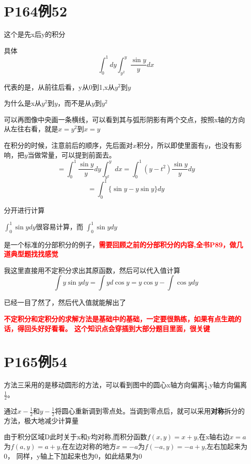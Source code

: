 \documentclass[a4paper]{ctexart}
\begin{document}
\begin{multicols}{2}
\section{P164例52}
\par 这个是先x后y的积分
\par 具体
\begin{equation}
\int_{0}^{1}{dy} \int_{y^2}^{y}
{
    \frac{\sin{y}}{y}dx
}
\end{equation}
\par 代表的是，从前往后看，y从0到1,x从$y^2$到$y$
\par 为什么是x从$y^2$到$y$，而不是从$y$到$y^2$
\par 可以再图像中央画一条横线，可以看到其与弧形阴影有两个交点，按照x轴的方向从左往右看，就是$x=y^2$到$x=y$
\par 在积分的时候，注意前后的顺序，先后面对$x$积分，所以即使里面有$y$，也没有影响，把$y$当做常量，可以提到前面去。
\begin{equation}
=
\int_{0}^{1}{\frac{\sin{y}}{y}dy} \int_{y^2}^{y}
{
    dx
}
=
\int_{0}^{1}{(y-t^2)\frac{\sin{y}}{y}dy}
\end{equation}
\begin{equation}
= \int_{0}^{1}{
        \{
            \sin{y} - y\sin{y}
        \}dy
    }
\end{equation}
\par 分开进行计算
\par $\int_{0}^{1}{\sin{y}dy}$很容易计算，而
$
\int_{0}^{1}{\sin{y}dy}
$
\par 是一个标准的分部积分的例子，\textbf{\textcolor{red}{需要回顾之前的分部积分的内容,全书P89，做几道典型题找找感觉}}
\par 我这里直接用不定积分求出其原函数，然后可以代入值计算
\begin{equation}
\int{y\sin{y}dy}
=
\int{yd\cos{y}}
= y\cos{y} - \int{\cos{y} dy}
\end{equation}
\par 已经一目了然了，然后代入值就能解出了
\par \textbf{\textcolor{red}{不定积分和定积分的求解方法是基础中的基础，一定要很熟练，如果有点生疏的话，得回头好好看看。 这个知识点会穿插到大部分题目里面，很关键}}

\section{P165例54}
\par 方法三采用的是移动圆形的方法，可以看到图中的圆心x轴方向偏离$\frac{1}{2}$,y轴方向偏离$\frac{1}{2}$。
\par 通过$x-\frac{1}{2}$和$y-\frac{1}{2}$将圆心重新调到零点处。当调到零点后，就可以采用\textbf{对称}拆分的方法，极大地减少计算量
\par 由于积分区域D此时关于x和y均对称,而积分函数$f(x,y) = x+y$,在x轴右边$x=a$为$f(a,y)=a+y$,在左边对称的地方$x=-a$为$f(-a,y) = -a + y$,左右加起来为0， 同样，y轴上下加起来也为0，如此结果为0


\end{multicols}
\end{document}
